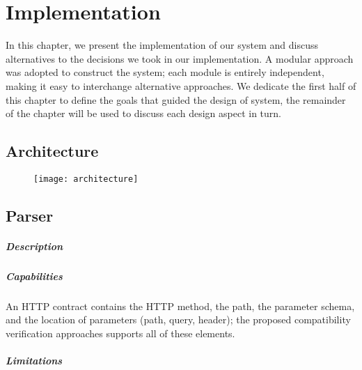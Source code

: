 
%

\chapter{Implementation}
\label{cha:implementation}

In this chapter, we present the implementation of our system and discuss alternatives to the decisions we took in our implementation.
A modular approach was adopted to construct the system;
each module is entirely independent, making it easy to interchange alternative approaches.
We dedicate the first half of this chapter to define the goals that guided the design of system,
the remainder of the chapter will be used to discuss each design aspect in turn.

\section{Architecture} %
\label{sec:architecture}

\begin{figure}[htbp]
    \centering
    \texttt{[image: architecture]}
    \label{fig:gantt}
\end{figure}

\section{Parser} %
\label{sec:parser}

\paragraph{Description}
\paragraph{Capabilities}
An HTTP contract contains the HTTP method, the
path, the parameter schema, and the location of parameters (path, query, header); the
proposed compatibility verification approaches supports all of these elements.
\paragraph{Limitations}
